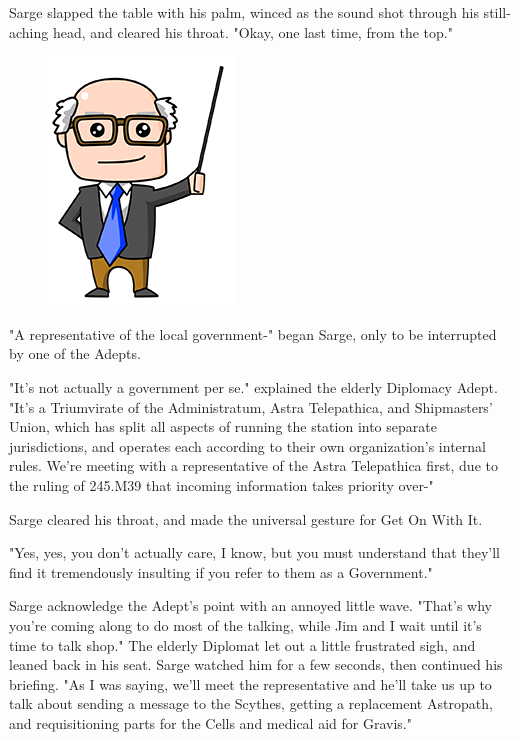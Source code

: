 Sarge slapped the table with his palm, winced as the sound shot through his still-aching head, and cleared his throat. 
"Okay, one last time, from the top."

\begin{figure}
	\begin{center}
		\includegraphics[width=\figwidth]{pics/14/2.png}
	\end{center}
\end{figure}
"A representative of the local government-" began Sarge, only to be interrupted by one of the Adepts.

"It's not actually a government per se." explained the elderly Diplomacy Adept. 
"It's a Triumvirate of the Administratum, Astra Telepathica, and Shipmasters' Union, which has split all aspects of running the station into separate jurisdictions, and operates each according to their own organization's internal rules. 
We're meeting with a representative of the Astra Telepathica first, due to the ruling of 245.M39 that incoming information takes priority over-"

Sarge cleared his throat, and made the universal gesture for Get On With It.

"Yes, yes, you don't actually care, I know, but you must understand that they'll find it tremendously insulting if you refer to them as a Government."

Sarge acknowledge the Adept's point with an annoyed little wave. 
"That's why you're coming along to do most of the talking, while Jim and I wait until it's time to talk shop." The elderly Diplomat let out a little frustrated sigh, and leaned back in his seat. 
Sarge watched him for a few seconds, then continued his briefing. 
"As I was saying, we'll meet the representative and he'll take us up to talk about sending a message to the Scythes, getting a replacement Astropath, and requisitioning parts for the Cells and medical aid for Gravis."

